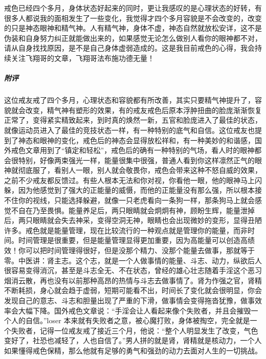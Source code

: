 \begin{case}
    戒色已经四个多月，身体状态好起来的同时，更让我感叹的是心理状态的好转，有很多人都说我的面相发生了一些变化，我觉得才四个多月容貌是不会改变的，改变的只是神态眼神和精气神。人有精气神，身体不虚，神态自然就放松安详，这不是伪装和自身努力纠正就能做出来的，如果感觉无论怎么做别人看你的眼神都不对，请从自身找找原因，是不是自己身体虚弱造成的。这是我目前戒色的心得，我会持续关注飞翔哥的文章，飞翔哥法布施功德无量！
    \subparagraph{附评} 这位戒友戒了四个多月，心理状态和容貌都有所改善，其实只要精气神提升了，容貌就会改变，精气神有塑形的效果，有的戒友戒色后原本浮肿扭曲的脸庞渐渐恢复正常了，变得紧实精致起来，到时真的焕然一新，五官和脸庞进入了最佳的状态，就像运动员进入了最佳的竞技状态一样，有一种特别的底气和自信。这位戒友也提到了神态和眼神的变化，戒色后的神态会显得放松祥和，有一种美妙的和谐感，国外戒色文章用到了“镇定和轻松”，戒色后的确有一种特别的气场，看人时的眼神都会很特别，好像两束强光一样，能量很集中很强，普通人看到你这样凛然正气的眼神就彻底服了，看别人一眼，别人就会敬畏你，戒色会带来这种不怒自威的效果，之前不少戒友都反馈过。有些人根本无法和你对视，你看他一眼，他的眼神马上闪躲，因为他感觉到了强大的正能量的威慑，而他的正能量没有那么强，所以根本接不住你的视线，只能选择躲避，就像一只老虎看向一条狗一样，那条狗马上就会感觉不自在乃至畏惧。能量养足后，两只眼睛就会炯炯有神，顾盼生辉，能量泄掉后，两只眼睛就会失去神采，变得空洞无神，眼睛也会出现微妙的变形，显得丑陋许多。戒色就是能量管理，现在比较流行的一种观点就是管理你的能量，而非时间。时间管理是很重要，但是能量管理显得更加重要，因为高能量可以创造高绩效！你可以把时间管理得很好，但是没那个精力、没那个能量去做事，那就等于零。中医讲：肾主志。这个志，就是一个人做事情的能量、斗志、动力，纵欲后人很容易变得消沉，甚至是斗志全无、不在状态，曾经的雄心壮志随着手淫这个恶习烟消云散，再也没有以前那种高昂的热情与斗志去做事情了。肾为作强之官，肾精不断耗损，身心就会趋于虚弱，短期可能看不出，时间长了变化就会很明显，你会发现自己的意志、斗志和胆量出现了严重的下滑，做事情会变得拖沓犹豫，做事效率会大幅下降。国外戒色文章说：“手淫会让人看起来像个失败者，并且会摧毁一个人的自信。”loser 本来就有失败者之意，被心魔打败，身体被掏空，完全就是一个失败者，记得一位戒友戒了接近三个月，他说：“整个人明显发生了改变，气色变好了，社恐也减轻了，人也自信了。”男人拼的就是肾，肾精就是核动力，一个人如果懂得戒色保精，那么他就有足够的勇气和强劲的动力去面对人生的一切挑战。
\end{case}

